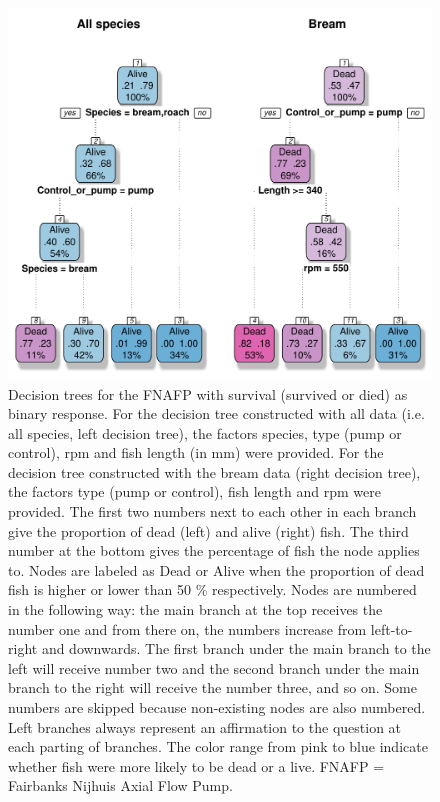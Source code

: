 \documentclass[fleqn,10pt]{wlscirep}
\begin{document}
\begin{figure}[ht]
  \centering
  \includegraphics[scale=0.75]{dt_mort_cropped}
  \caption{Decision trees for the FNAFP with survival (survived or died) as binary response. For the decision tree constructed with all data (i.e. all species, left decision tree), the factors species, type (pump or control), rpm and fish length (in mm) were provided. For the decision tree constructed with the bream data (right decision tree), the factors type (pump or control), fish length and rpm were provided. The first two numbers next to each other in each branch give the proportion of dead (left) and alive (right) fish. The third number at the bottom gives the percentage of fish the node applies to. Nodes are labeled as Dead or Alive when the proportion of dead fish is higher or lower than 50 \% respectively. Nodes are numbered in the following way: the main branch at the top receives the number one and from there on, the numbers increase from left-to-right and downwards. The first branch under the main branch to the left will receive number two and the second branch under the main branch to the right will receive the number three, and so on. Some numbers are skipped because non-existing nodes are also numbered. Left branches always represent an affirmation to the question at each parting of branches. The color range from pink to blue indicate whether fish were more likely to be dead or a live. FNAFP = Fairbanks Nijhuis Axial Flow Pump.}
  \label{fig:dt_mort}
\end{figure}
\end{document}
